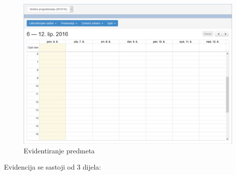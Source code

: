 \documentclass[times, utf8, zavrsni]{fer}
\begin{document}
\begin{figure}[H]
\centering
\includegraphics[width=\textwidth,height=\textheight,keepaspectratio]{img/evidencija-web.png}
\caption{Evidentiranje predmeta}
\label{fig:evidencija-web}
\end{figure}

Evidencija se sastoji od 3 dijela:
\end{document}
